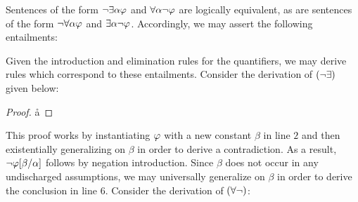 Sentences of the form $\neg\exists \alpha\varphi$ and $\forall \alpha\neg\varphi$ are logically equivalent, as are sentences of the form $\neg\forall \alpha\varphi$ and $\exists \alpha\neg\varphi$.
Accordingly, we may assert the following entailments: 


Given the introduction and elimination rules for the quantifiers, we may derive rules which correspond to these entailments.
Consider the derivation of $(\neg\exists)$ given below:

\begin{proof}
	      \pr{}
    \open
            
             
        \r{a}
    \close
       
         
\end{proof}

This proof works by instantiating $\varphi$ with a new constant $\beta$ in line $2$ and then existentially generalizing on $\beta$ in order to derive a contradiction.
As a result, $\neg\varphi[\beta/\alpha]$ follows by negation introduction. 
Since $\beta$ does not occur in any undischarged assumptions, we may universally generalize on $\beta$ in order to derive the conclusion in line $6$. 
Consider the derivation of $(\forall\neg)$: 

